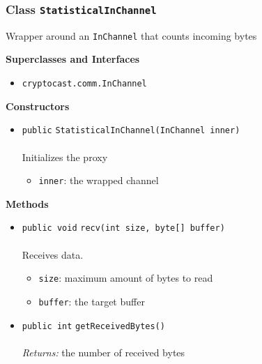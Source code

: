 \subsubsection{Class \lstinline|StatisticalInChannel|}
Wrapper around an \lstinline|InChannel| that counts incoming bytes \\
\noindent\begin{minipage}[t]{5cm}
\vspace{0.3em}
\hspace*{2em}
\vspace{0.3em}
\end{minipage}



\textbf{\sffamily Superclasses and Interfaces}
\begin{itemize}
\item \lstinline|cryptocast.comm.InChannel|
\end{itemize}


\textbf{\sffamily Constructors}
\begin{itemize}
\item \lstinline|public| \lstinline|StatisticalInChannel|\lstinline|(InChannel inner)|\\ \\[-0.6em]
Initializes the proxy
\begin{itemize}
\item \lstinline|inner|: the wrapped channel
\end{itemize}



\end{itemize}


\textbf{\sffamily Methods}
\begin{itemize}
\item \lstinline|public void| \lstinline|recv|\lstinline|(int size, byte[] buffer)|\\ \\[-0.6em]
Receives data.
\begin{itemize}
\item \lstinline|size|: maximum amount of bytes to read
\item \lstinline|buffer|: the target buffer
\end{itemize}



\item \lstinline|public int| \lstinline|getReceivedBytes|\lstinline|()|\\ \\[-0.6em]
\emph{Returns:} the number of received bytes



\end{itemize}

